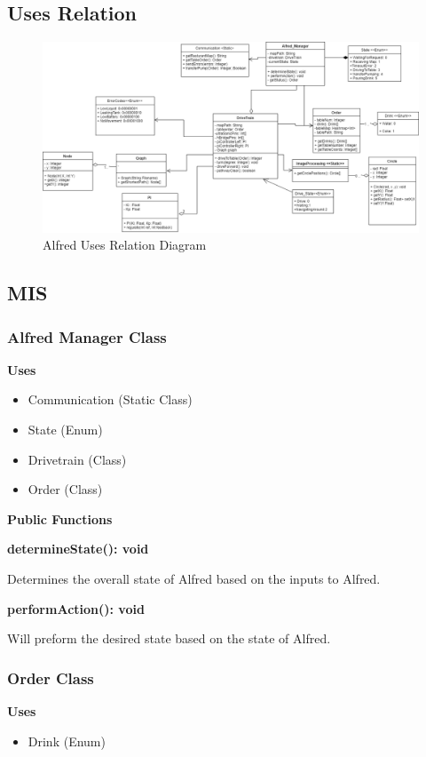 \documentclass [10pt]{article}
\begin{document}
\subsection{Uses Relation}
\begin{figure} [h!]
	\centering
	\includegraphics [scale = 0.4] {figures/Alfred_UsesDiagram.png}
	\caption{Alfred Uses Relation Diagram}
\end{figure}


\subsection{MIS}

\subsubsection{Alfred Manager Class}

\textbf{Uses}
\begin{itemize}
	\item Communication (Static Class)
	\item State (Enum)
	\item Drivetrain (Class)
	\item Order (Class)
\end{itemize}



\textbf{Public Functions}

\textbf{determineState(): void}

Determines the overall state of Alfred based on the inputs to Alfred.

\textbf{performAction(): void}

Will preform the desired state based on the state of Alfred.

\subsubsection{Order Class}
\textbf{Uses}
\begin{itemize}
	\item Drink (Enum)
\end{itemize}
\end{document}
